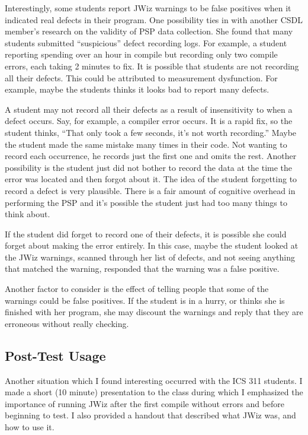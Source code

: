 Interestingly, some students report JWiz warnings to be false positives
when it indicated real defects in their program.  One possibility ties in
with another CSDL member's research on the validity of PSP data
collection\cite{Disney98}.  She found that many students submitted
``suspicious'' defect recording logs.  For example, a student reporting
spending over an hour in compile but recording only two compile errors,
each taking 2 minutes to fix.  It is possible that students are not
recording all their defects.  This could be attributed to measurement
dysfunction\cite{Austin96}.  For example, maybe the students thinks it
looks bad to report many defects. 

A student may not record all their defects as a result of insensitivity to
when a defect occurs.  Say, for example, a compiler error occurs.  It is a
rapid fix, so the student thinks, ``That only took a few seconds, it's not
worth recording.''  Maybe the student made the same mistake many times in
their code.  Not wanting to record each occurrence, he records just the
first one and omits the rest.  Another possibility is the student just did
not bother to record the data at the time the error was located and then
forgot about it.  The idea of the student forgetting to record a defect is
very plausible.  There is a fair amount of cognitive overhead in performing 
the PSP and it's possible the student just had too many things to think
about\cite{Anderson85}.

If the student did forget to record one of their defects, it is possible
she could forget about making the error entirely.  In this case, maybe the
student looked at the JWiz warnings, scanned through her list of defects,
and not seeing anything that matched the warning, responded that the
warning was a false positive.

Another factor to consider is the effect of telling people that some of the
warnings could be false positives.  If the student is in a hurry, or thinks
she is finished with her program, she may discount the warnings and reply
that they are erroneous without really checking.


\subsection{Post-Test Usage}
Another situation which I found interesting occurred with the ICS 311
students.  I made a short (10 minute) presentation to the class during
which I emphasized the importance of running JWiz after the first compile
without errors and before beginning to test.  I also provided a handout
that described what JWiz was, and how to use it.

